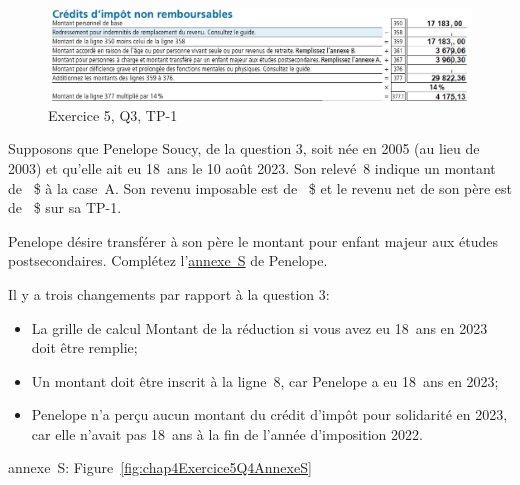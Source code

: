 \begin{figure}
	\centering
	\includegraphics[width=.9\textwidth]{exercice/4-5/Q3/TP-1.png}
	\caption{Exercice 5, Q3, TP-1}
	\label{fig:chap4Exercice5Q3TP1}
\end{figure}

\begin{question}
	Supposons que Penelope Soucy, de la question 3, soit née en 2005 (au lieu de 2003) et qu'elle ait eu 18~ans le 10 août 2023. Son relevé~8 indique un montant de ~\$ à la case~A. Son revenu imposable est de ~\$ et le revenu net de son père est de ~\$ sur sa TP-1.
\end{question}
\setcounter{sousQuestion}{0}
\begin{sousQuestion}
	Penelope désire transférer à son père le montant pour enfant majeur aux études postsecondaires. Complétez l'\href{https://www.revenuquebec.ca/documents/fr/formulaires/tp/2023-12/TP-1.D.S%282023-12%29.pdf}{annexe~S} de Penelope.
\end{sousQuestion}
Il y a trois changements par rapport à la question 3:
\begin{itemize}
	\item La grille de calcul \og Montant de la réduction si vous avez eu 18~ans en 2023 \fg{} doit être remplie;
	\item Un montant doit être inscrit à la ligne~8, car Penelope a eu 18~ans en 2023;
	\item Penelope n'a perçu aucun montant du crédit d'impôt pour solidarité en 2023, car elle n'avait pas 18~ans à la fin de l'année d'imposition 2022.
\end{itemize}
annexe~S: Figure~\ref{fig:chap4Exercice5Q4AnnexeS}

